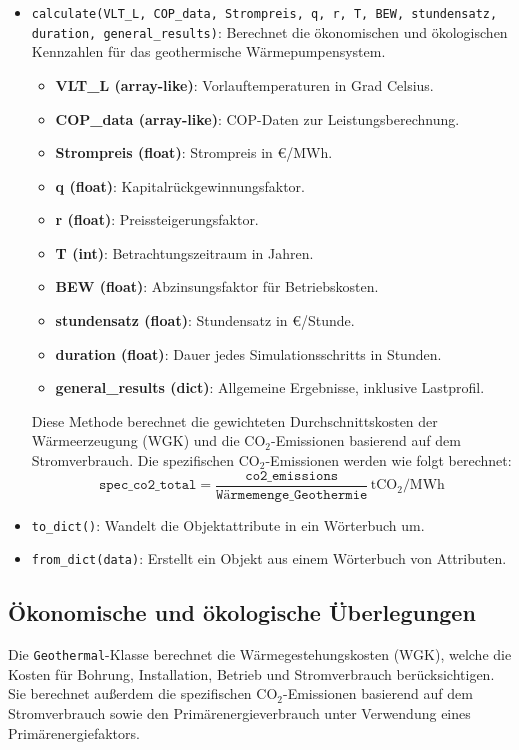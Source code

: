 \begin{itemize}
    \item \texttt{calculate(VLT\_L, COP\_data, Strompreis, q, r, T, BEW, stundensatz, duration, general\_results)}: Berechnet die ökonomischen und ökologischen Kennzahlen für das geothermische Wärmepumpensystem.
    \begin{itemize}
        \item \textbf{VLT\_L (array-like)}: Vorlauftemperaturen in Grad Celsius.
        \item \textbf{COP\_data (array-like)}: COP-Daten zur Leistungsberechnung.
        \item \textbf{Strompreis (float)}: Strompreis in €/MWh.
        \item \textbf{q (float)}: Kapitalrückgewinnungsfaktor.
        \item \textbf{r (float)}: Preissteigerungsfaktor.
        \item \textbf{T (int)}: Betrachtungszeitraum in Jahren.
        \item \textbf{BEW (float)}: Abzinsungsfaktor für Betriebskosten.
        \item \textbf{stundensatz (float)}: Stundensatz in €/Stunde.
        \item \textbf{duration (float)}: Dauer jedes Simulationsschritts in Stunden.
        \item \textbf{general\_results (dict)}: Allgemeine Ergebnisse, inklusive Lastprofil.
    \end{itemize}
    Diese Methode berechnet die gewichteten Durchschnittskosten der Wärmeerzeugung (WGK) und die CO$_2$-Emissionen basierend auf dem Stromverbrauch. Die spezifischen CO$_2$-Emissionen werden wie folgt berechnet:
    \[
    \texttt{spec\_co2\_total} = \frac{\texttt{co2\_emissions}}{\texttt{Wärmemenge\_Geothermie}} \, \text{tCO$_2$/MWh}
    \]

    \item \texttt{to\_dict()}: Wandelt die Objektattribute in ein Wörterbuch um.
    
    \item \texttt{from\_dict(data)}: Erstellt ein Objekt aus einem Wörterbuch von Attributen.
\end{itemize}

\subsection{Ökonomische und ökologische Überlegungen}
Die \texttt{Geothermal}-Klasse berechnet die Wärmegestehungskosten (WGK), welche die Kosten für Bohrung, Installation, Betrieb und Stromverbrauch berücksichtigen. Sie berechnet außerdem die spezifischen CO$_2$-Emissionen basierend auf dem Stromverbrauch sowie den Primärenergieverbrauch unter Verwendung eines Primärenergiefaktors.

